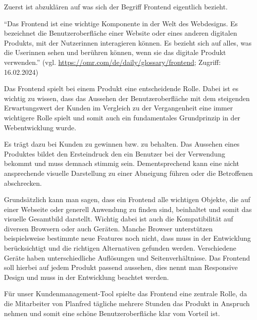 Zuerst ist abzuklären auf was sich der Begriff Frontend eigentlich bezieht.

“Das Frontend ist eine wichtige Komponente in der Welt des Webdesigns. Es bezeichnet die Benutzeroberfläche einer Website oder eines anderen digitalen Produkts, mit der Nutzerinnen interagieren können. Es bezieht sich auf alles, was die Userinnen sehen und berühren können, wenn sie das digitale Produkt verwenden.”
\newline
(vgl. \url{https://omr.com/de/daily/glossary/frontend}; Zugriff: 16.02.2024)

Das Frontend spielt bei einem Produkt eine entscheidende Rolle. Dabei ist es wichtig zu wissen, dass das Aussehen der Benutzeroberfläche mit dem steigenden Erwartungswert der Kunden im Vergleich zu der Vergangenheit eine immer wichtigere Rolle spielt und somit auch ein fundamentales Grundprinzip in der Webentwicklung wurde. 

Es trägt dazu bei Kunden zu gewinnen bzw. zu behalten. Das Aussehen eines Produktes bildet den Ersteindruck den ein Benutzer bei der Verwendung bekommt und muss demnach stimmig sein. Dementsprechend kann eine nicht ansprechende visuelle Darstellung zu einer Abneigung führen oder die Betroffenen abschrecken. 

Grundsätzlich kann man sagen, dass ein Frontend alle wichtigen Objekte, die auf einer Webseite oder generell Anwendung zu finden sind, beinhaltet und somit das visuelle Gesamtbild darstellt. Wichtig dabei ist auch die Kompatibilität auf diversen Browsern oder auch Geräten. Manche Browser unterstützen beispielsweise bestimmte neue Features noch nicht, dass muss in der Entwicklung berücksichtigt und die richtigen Alternativen gefunden werden. Verschiedene Geräte haben unterschiedliche Auflösungen und Seitenverhältnisse. Das Frontend soll hierbei auf jedem Produkt passend aussehen, dies nennt man Responsive Design und muss in der Entwicklung beachtet werden.

Für unser Kundenmanagement-Tool spielte das Frontend eine zentrale Rolle, da die Mitarbeiter von Planfred tägliche mehrere Stunden das Produkt in Anspruch nehmen und somit eine schöne Benutzeroberfläche klar vom Vorteil ist.
\cite{frontend_grundlagen}
